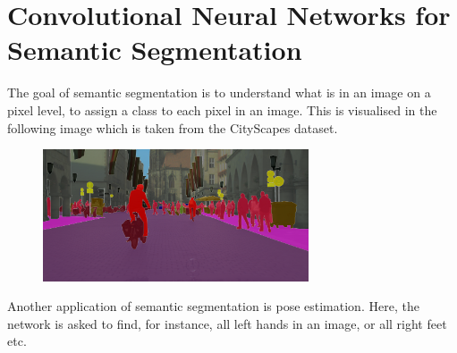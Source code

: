 \section{Convolutional Neural Networks for Semantic Segmentation}
The goal of semantic segmentation is to understand what is in an image on a
pixel level, \ie to assign a class to each pixel in an image. This is visualised
in the following image which is taken from the CityScapes dataset.
\begin{figure}[H]
  \centering \includegraphics[width=0.7\textwidth]{Figures/cityscapes}
\end{figure}
Another application of semantic segmentation is pose estimation. Here, the
network is asked to find, for instance, all left hands in an image, or all right
feet etc.

